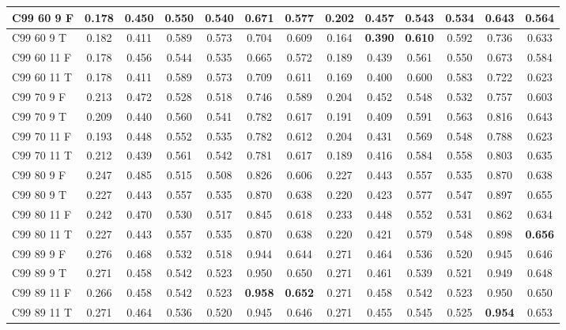 \documentclass{article}
\begin{document}
\begin{longtable}[c]{|l|c|c|c|c|c|c||c|c|c|c|c|c|}
C99 60  9 F & 0.178 & 0.450 & 0.550 & 0.540 & 0.671 & 0.577 & 0.202 & 0.457 & 0.543 & 0.534 & 0.643 & 0.564\\ \hline
C99 60  9 T & 0.182 & 0.411 & 0.589 & 0.573 & 0.704 & 0.609 & 0.164 & \textbf{0.390} & \textbf{0.610} & 0.592 & 0.736 & 0.633\\ \hline
C99 60 11 F & 0.178 & 0.456 & 0.544 & 0.535 & 0.665 & 0.572 & 0.189 & 0.439 & 0.561 & 0.550 & 0.673 & 0.584\\ \hline
C99 60 11 T & 0.178 & 0.411 & 0.589 & 0.573 & 0.709 & 0.611 & 0.169 & 0.400 & 0.600 & 0.583 & 0.722 & 0.623\\ \hline
C99 70  9 F & 0.213 & 0.472 & 0.528 & 0.518 & 0.746 & 0.589 & 0.204 & 0.452 & 0.548 & 0.532 & 0.757 & 0.603\\ \hline
C99 70  9 T & 0.209 & 0.440 & 0.560 & 0.541 & 0.782 & 0.617 & 0.191 & 0.409 & 0.591 & 0.563 & 0.816 & 0.643\\ \hline
C99 70 11 F & 0.193 & 0.448 & 0.552 & 0.535 & 0.782 & 0.612 & 0.204 & 0.431 & 0.569 & 0.548 & 0.788 & 0.623\\ \hline
C99 70 11 T & 0.212 & 0.439 & 0.561 & 0.542 & 0.781 & 0.617 & 0.189 & 0.416 & 0.584 & 0.558 & 0.803 & 0.635\\ \hline
C99 80  9 F & 0.247 & 0.485 & 0.515 & 0.508 & 0.826 & 0.606 & 0.227 & 0.443 & 0.557 & 0.535 & 0.870 & 0.638\\ \hline
C99 80  9 T & 0.227 & 0.443 & 0.557 & 0.535 & 0.870 & 0.638 & 0.220 & 0.423 & 0.577 & 0.547 & 0.897 & 0.655\\ \hline
C99 80 11 F & 0.242 & 0.470 & 0.530 & 0.517 & 0.845 & 0.618 & 0.233 & 0.448 & 0.552 & 0.531 & 0.862 & 0.634\\ \hline
C99 80 11 T & 0.227 & 0.443 & 0.557 & 0.535 & 0.870 & 0.638 & 0.220 & 0.421 & 0.579 & 0.548 & 0.898 & \textbf{0.656}\\ \hline
C99 89  9 F & 0.276 & 0.468 & 0.532 & 0.518 & 0.944 & 0.644 & 0.271 & 0.464 & 0.536 & 0.520 & 0.945 & 0.646\\ \hline
C99 89  9 T & 0.271 & 0.458 & 0.542 & 0.523 & 0.950 & 0.650 & 0.271 & 0.461 & 0.539 & 0.521 & 0.949 & 0.648\\ \hline
C99 89 11 F & 0.266 & 0.458 & 0.542 & 0.523 & \textbf{0.958} & \textbf{0.652} & 0.271 & 0.458 & 0.542 & 0.523 & 0.950 & 0.650\\ \hline
C99 89 11 T & 0.271 & 0.464 & 0.536 & 0.520 & 0.945 & 0.646 & 0.271 & 0.455 & 0.545 & 0.525 & \textbf{0.954} & 0.653\\ \hline
\end{longtable} 
\end{document}

